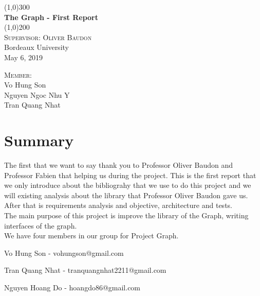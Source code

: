 \documentclass[a4paper,10pt]{article}
\begin{document}
\begin{titlepage} 
	\begin{center}
	\line(1,0){300}\\
	[0.25in]
	\huge{\bfseries The Graph - First Report}\\
	[2mm]
	\line(1,0){200}\\
	[1cm]
	\textsc{\Large Supervisor: Oliver Baudon}\\
	\textmd{\Large Bordeaux University \\
	May 6, 2019}\\
	[13cm]
	\end{center}
	\begin{flushright}
	\textsc{Member: \\}
	Vo Hung Son \\
	Nguyen Ngoc Nhu Y \\
	Tran Quang Nhat \\
	\end{flushright}
\end{titlepage}
%

\section*{Summary}

The first that we want to say thank you to Professor Oliver Baudon and Professor Fabien that helping us during the project. This is the first report that we only introduce about the bibliograhy that we use to do this project and we will existing analysis about the library that Professor Oliver Baudon gave us. After that is requirements analysis and objective, architecture and tests. \\
The main purpose of this project is improve the library of the Graph, writing interfaces of the graph.\\
We have four members in our group for Project Graph.

Vo Hung Son - vohungson@gmail.com

Tran Quang Nhat - tranquangnhat2211@gmail.com

Nguyen Hoang Do - hoangdo86@gmail.com
\end{document}
